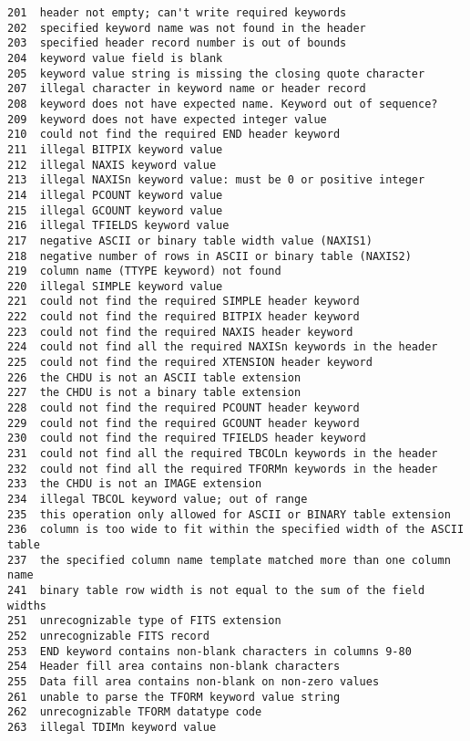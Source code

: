\documentclass[11pt]{book}
\begin{document}
\begin{verbatim}
201  header not empty; can't write required keywords
202  specified keyword name was not found in the header
203  specified header record number is out of bounds
204  keyword value field is blank
205  keyword value string is missing the closing quote character
207  illegal character in keyword name or header record
208  keyword does not have expected name. Keyword out of sequence?
209  keyword does not have expected integer value
210  could not find the required END header keyword
211  illegal BITPIX keyword value
212  illegal NAXIS keyword value
213  illegal NAXISn keyword value: must be 0 or positive integer
214  illegal PCOUNT keyword value
215  illegal GCOUNT keyword value
216  illegal TFIELDS keyword value
217  negative ASCII or binary table width value (NAXIS1)
218  negative number of rows in ASCII or binary table (NAXIS2)
219  column name (TTYPE keyword) not found
220  illegal SIMPLE keyword value
221  could not find the required SIMPLE header keyword
222  could not find the required BITPIX header keyword
223  could not find the required NAXIS header keyword
224  could not find all the required NAXISn keywords in the header
225  could not find the required XTENSION header keyword
226  the CHDU is not an ASCII table extension
227  the CHDU is not a binary table extension
228  could not find the required PCOUNT header keyword
229  could not find the required GCOUNT header keyword
230  could not find the required TFIELDS header keyword
231  could not find all the required TBCOLn keywords in the header
232  could not find all the required TFORMn keywords in the header
233  the CHDU is not an IMAGE extension
234  illegal TBCOL keyword value; out of range
235  this operation only allowed for ASCII or BINARY table extension
236  column is too wide to fit within the specified width of the ASCII table
237  the specified column name template matched more than one column name
241  binary table row width is not equal to the sum of the field widths
251  unrecognizable type of FITS extension
252  unrecognizable FITS record
253  END keyword contains non-blank characters in columns 9-80
254  Header fill area contains non-blank characters
255  Data fill area contains non-blank on non-zero values
261  unable to parse the TFORM keyword value string
262  unrecognizable TFORM datatype code
263  illegal TDIMn keyword value


\end{verbatim}
\end{document}
